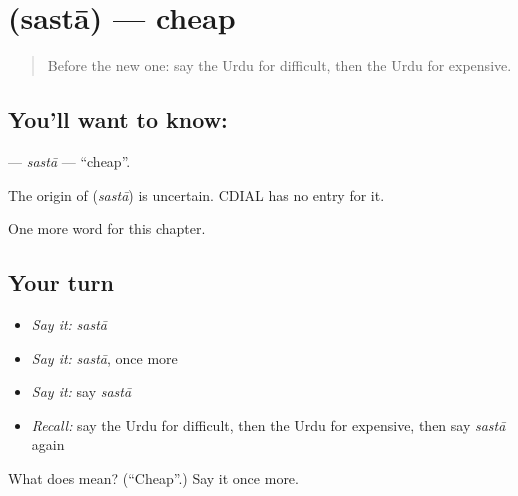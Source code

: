 \section[\texorpdfstring{\ur{سستا} (sastā)}{سستا (sastā)}]{ (sastā) — cheap}

\label{lesson:UR-C71-sasta}



\begin{quote}
Before the new one: say the Urdu for difficult, then the Urdu for expensive.
\end{quote}

\subsection*{You'll want to know: }
\textbf{} — \emph{sastā} — \textquotedblleft{}cheap\textquotedblright{}.

\begin{cousinweb}
The origin of \textbf{} (\emph{sastā}) is uncertain. CDIAL has no entry for it.
\end{cousinweb}

\begin{grammarlens}[title={What you've built}]
One more word for this chapter.
\end{grammarlens}

\subsection*{Your turn}
\begin{itemize}
\raggedright
  \item \emph{Say it:} \emph{sastā}
  \item \emph{Say it:} \emph{sastā}, once more
  \item \emph{Say it:} say \emph{sastā}
  \item \emph{Recall:} say the Urdu for difficult, then the Urdu for expensive, then say \emph{sastā} again
\end{itemize}

\begin{tcolorbox}[breakable,colback=teal!4,colframe=teal!35!black,title={Before you move on}]
What does  mean? (\textquotedblleft{}Cheap\textquotedblright{}.) Say it once more.
\end{tcolorbox}
